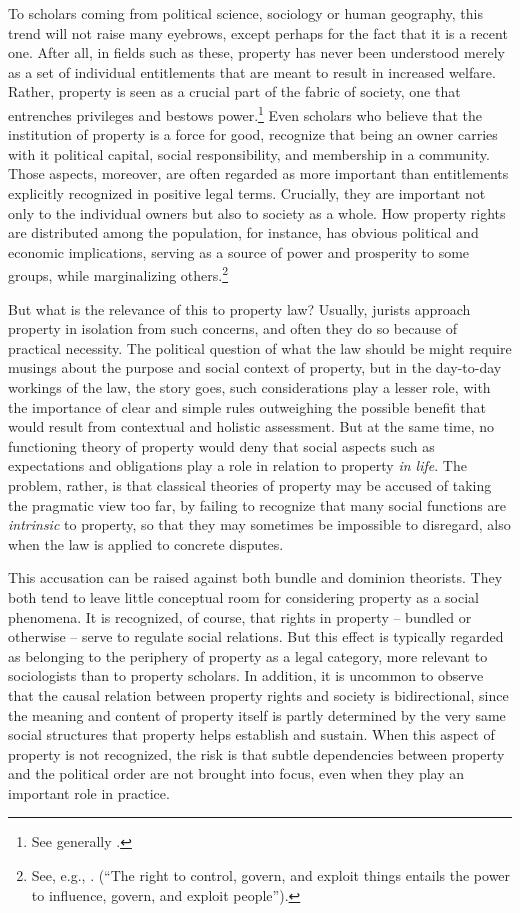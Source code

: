 \documentclass[12pt,a4paper]{book} %
\begin{document}
To scholars coming from political science, sociology or human geography, this trend will not raise many eyebrows, except perhaps for the fact that it is a recent one. After all, in fields such as these, property has never been understood merely as a set of individual entitlements that are meant to result in increased welfare. Rather, property is seen as a crucial part of the fabric of society, one that entrenches privileges and bestows power.\footnote{See generally \cite{carruthers04}.} Even scholars who believe that the institution of property is a force for good, recognize that being an owner carries with it political capital, social responsibility, and membership in a community. Those aspects, moreover, are often regarded as more important than entitlements explicitly recognized in positive legal terms. Crucially, they are important not only to the individual owners but also to society as a whole. How property rights are distributed among the population, for instance, has obvious political and economic implications, serving as a source of power and prosperity to some groups, while marginalizing others.\footnote{See, e.g., \cite[23]{carruthers04}. (``The right to control, govern, and exploit things entails the power to influence, govern, and exploit people'').}

But what is the relevance of this to property law? Usually, jurists approach property in isolation from such concerns, and often they do so because of practical necessity. The political question of what the law should be might require musings about the purpose and social context of property, but in the day-to-day workings of the law, the story goes, such considerations play a lesser role, with the importance of clear and simple rules outweighing the possible benefit that would result from contextual and holistic assessment. But at the same time, no functioning theory of  property would deny that social aspects such as expectations and obligations play a role in relation to property {\it in life}. The problem, rather, is that classical theories of property may be accused of taking the pragmatic view too far, by failing to recognize that many social functions are {\it intrinsic} to property, so that they may sometimes be impossible to disregard, also when the law is applied to concrete disputes.

This accusation can be raised against both bundle and dominion theorists. They both tend to leave little conceptual room for considering property as a social phenomena. It is recognized, of course, that rights in property -- bundled or otherwise -- serve to regulate social relations. But this effect is typically regarded as belonging to the periphery of property as a legal category, more relevant to sociologists than to property scholars. In addition, it is uncommon to observe that the causal relation between property rights and society is bidirectional, since the meaning and content of property itself is partly determined by the very same social structures that property helps establish and sustain. When this aspect of property is not recognized, the risk is that subtle dependencies between property and the political order are not brought into focus, even when they play an important role in practice.
\end{document}
